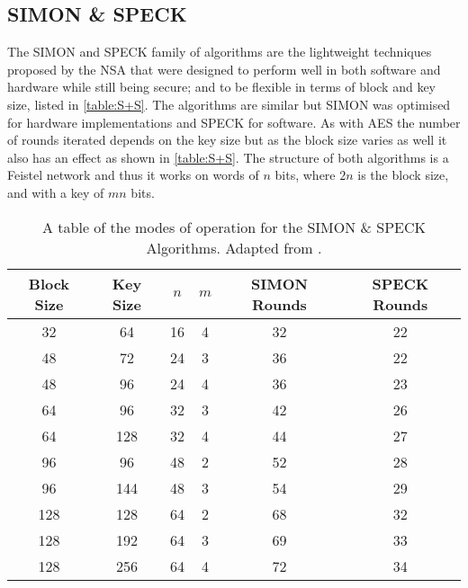 \documentclass[12pt,twoside,a4paper]{report}
\begin{document}
    \subsection{SIMON \& SPECK}
    The SIMON and SPECK family of algorithms are the lightweight techniques proposed by the NSA that were designed to perform well in both software and hardware while still being secure; and to be flexible in terms of block and key size, listed in \autoref{table:S+S}.
    The algorithms are similar but SIMON was optimised for hardware implementations and SPECK for software.
    As with AES the number of rounds iterated depends on the key size but as the block size varies as well it also has an effect as shown in \autoref{table:S+S}.
    The structure of both algorithms is a Feistel network and thus it works on words of $n$ bits, where $2n$ is the block size, and with a key of $mn$ bits.
    
        \begin{table}[H]
        \centering
        \begin{tabular}{||c|c|c|c|c|c||}
            \hline \hline
            Block Size & Key Size & $n$ & $m$ & SIMON Rounds & SPECK Rounds \\
            \hline \hline
            32 & 64 & 16 & 4 & 32 & 22 \\
            \hline
            48 & 72 & 24 & 3 & 36 & 22 \\
            48 & 96 & 24 & 4 & 36 & 23 \\
            \hline
            64 & 96 & 32 & 3 & 42 & 26 \\
            64 & 128 & 32 & 4 & 44 & 27 \\
            \hline
            96 & 96 & 48 & 2 & 52 & 28 \\
            96 & 144 & 48 & 3 & 54 & 29 \\
            \hline
            128 & 128 & 64 & 2 & 68 & 32 \\
            128 & 192 & 64 & 3 & 69 & 33 \\
            128 & 256 & 64 & 4 & 72 & 34 \\
            \hline \hline
        \end{tabular}
        \caption{A table of the modes of operation for the SIMON \& SPECK Algorithms. Adapted from \cite{Beaulieu2015}.}
        \label{table:S+S}
        \end{table}
    
\end{document}
